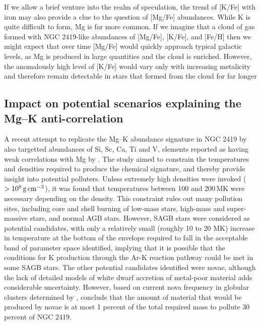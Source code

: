 \documentclass[a4paper,fleqn,usenatbib]{mnras}
\begin{document}
If we allow a brief venture into the realm of speculation, the trend of [K/Fe] with iron may also provide a clue to the question of [Mg/Fe] abundances. While K is quite difficult to form, Mg is far more common. If we imagine that a cloud of gas formed with NGC 2419-like abundances of [Mg/Fe], [K/Fe], and [Fe/H] then we might expect that over time [Mg/Fe] would quickly approach typical galactic levels, as Mg is produced in large quantities and the cloud is enriched. However, the anomalously high level of [K/Fe] would vary only with increasing metalicity and therefore remain detectable in stars that formed from the cloud for far longer

\subsection{Impact on potential scenarios explaining the Mg--K anti-correlation}



A recent attempt to replicate the Mg--K abundance signature in NGC 2419 by \cite{iliadis2016} also targetted abundances of Si, Sc, Ca, Ti and V, elements reported as having weak correlations with Mg by \cite{cohenkirby2012}. The study aimed to constrain the temperatures and densities required to produce the chemical signature, and thereby provide insight into potential polluters.
Unless extremely high densities were invoked ($>10^8\,{\rm g\,cm}^{-3}$), it was found that temperatures between 100 and 200\,MK were necessary depending on the density. This constraint rules out many pollution sites, including core and shell burning of low-mass stars, high-mass and super-massive stars, and normal AGB stars. However, SAGB stars were considered as potential candidates, with only a relatively small (roughly 10 to 20 MK) increase in temperature at the bottom of the envelope required to fall in the acceptable band of parameter space identified, implying that it is possible that the conditions for K production through the Ar-K reaction pathway could be met in some SAGB stars. The other potential candidates identified were novae, although the lack of detailed models of white dwarf accretion of metal-poor material adds considerable uncertainty. However, based on current nova frequency in globular clusters determined by \cite{kato2013novae}, \cite{iliadis2016} conclude that the amount of material that would be produced by novae is at most 1 percent of the total required mass to pollute 30 percent of NGC 2419.
\end{document}
